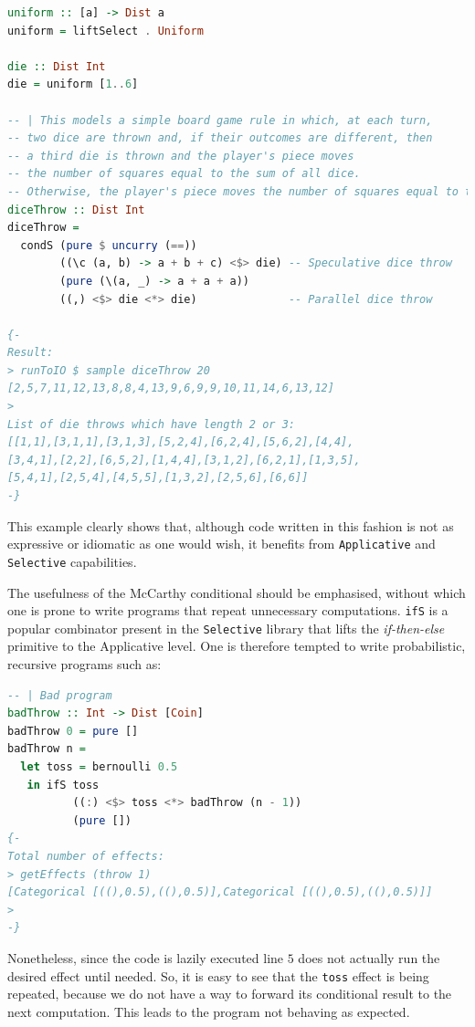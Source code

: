 \documentclass[
  oneside,
  11pt, a4paper,
  footinclude=true,
  headinclude=true,
  cleardoublepage=empty
]{scrbook}
\theoremstyle{definition}
\theoremstyle{definition}
\begin{document}
    \begin{lstlisting}[language=Haskell, caption={Throw game dice},captionpos=b, label={lst:dicethrow}]
uniform :: [a] -> Dist a
uniform = liftSelect . Uniform
 
die :: Dist Int
die = uniform [1..6]

-- | This models a simple board game rule in which, at each turn,
-- two dice are thrown and, if their outcomes are different, then
-- a third die is thrown and the player's piece moves
-- the number of squares equal to the sum of all dice.
-- Otherwise, the player's piece moves the number of squares equal to three times the value of the two equally-faced dies.
diceThrow :: Dist Int
diceThrow =
  condS (pure $ uncurry (==))
        ((\c (a, b) -> a + b + c) <$> die) -- Speculative dice throw
        (pure (\(a, _) -> a + a + a))
        ((,) <$> die <*> die)              -- Parallel dice throw

{-
Result:
> runToIO $ sample diceThrow 20
[2,5,7,11,12,13,8,8,4,13,9,6,9,9,10,11,14,6,13,12]
>
List of die throws which have length 2 or 3:
[[1,1],[3,1,1],[3,1,3],[5,2,4],[6,2,4],[5,6,2],[4,4],
[3,4,1],[2,2],[6,5,2],[1,4,4],[3,1,2],[6,2,1],[1,3,5],
[5,4,1],[2,5,4],[4,5,5],[1,3,2],[2,5,6],[6,6]]
-}
    \end{lstlisting}
    
    \noindent This example clearly shows that, although code written in this fashion is not as expressive or idiomatic as one would wish, it benefits from \texttt{Applicative} and \texttt{Selective} capabilities. 
    
    The usefulness of the McCarthy conditional should be emphasised, without which one is prone to write programs that repeat unnecessary computations. \texttt{ifS} is a popular combinator present in the \texttt{Selective} library that lifts the \textit{if-then-else} primitive to the Applicative level. One is therefore tempted to write probabilistic, recursive programs such as:
    
    \begin{lstlisting}[language=Haskell, caption={Bad program},captionpos=b]
-- | Bad program
badThrow :: Int -> Dist [Coin]
badThrow 0 = pure []
badThrow n =
  let toss = bernoulli 0.5
   in ifS toss
          ((:) <$> toss <*> badThrow (n - 1))
          (pure [])
{-
Total number of effects:
> getEffects (throw 1)
[Categorical [((),0.5),((),0.5)],Categorical [((),0.5),((),0.5)]]
>
-}
    \end{lstlisting}
  
    Nonetheless, since the code is lazily executed line $5$ does not actually run the desired effect until needed. So, it is easy to see that the \texttt{toss} effect is being repeated, because we do not have a way to forward its conditional result to the next computation. This leads to the program not behaving as expected.
    
\end{document}
